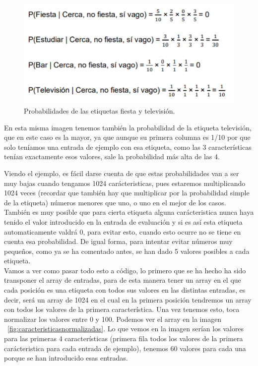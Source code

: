 \documentclass[a4paper, 12pt]{book}
\begin{document}
\begin{figure}
	\centering
	\includegraphics[width=12cm, keepaspectratio]{img/probabilidadesbayes}
	\caption{Probabilidades de las etiquetas fiesta y televisión.}			
	\label{fig:probabilidadesbayes}
\end{figure}

En esta misma imagen tenemos también la probabilidad de la etiqueta televisión, que en este caso es la mayor, ya que aunque su primera columna es 1/10 por que solo teníamos una entrada de ejemplo con esa etiqueta, como las 3 características tenían exactamente esos valores, sale la probabilidad más alta de las 4.

Viendo el ejemplo, es fácil darse cuenta de que estas probabilidades van a ser muy bajas cuando tengamos 1024 carácteristicas, pues estaremos multiplicando 1024 veces (recordar que también hay que multiplicar por la probabilidad simple de la etiqueta) números menores que uno, o uno en el mejor de los casos.
También es muy posible que para cierta etiqueta alguna carácteristica nunca haya tenido el valor introducido en la entrada de evaluación y si es así esta etiqueta automaticamente valdrá 0, para evitar esto, cuando esto ocurre no se tiene en cuenta esa probabilidad. De igual forma, para intentar evitar números muy pequeños, como ya se ha comentado antes, se han dado 5 valores posibles a cada etiqueta. \\
Vamos a ver como pasar todo esto a código, lo primero que se ha hecho ha sido transponer el array de entradas, para de esta manera tener un array en el que cada posición es una etiqueta con todos sus valores en las distintas entradas, es decir, será un array de 1024 en el cual en la primera posición tendremos un array con todos los valores de la primera característica. Una vez tenemos esto, toca normalizar los valores entre 0 y 100. Podemos ver el array en la imagen 
~\ref{fig:caracteristicasnormalizadas}. Lo que vemos en la imagen serían los valores para las primeras 4 características (primera fila todos los valores de la primera carácteristica para cada entrada de ejemplo), tenemos 60 valores para cada una porque se han introducido esas entradas.
\end{document}
